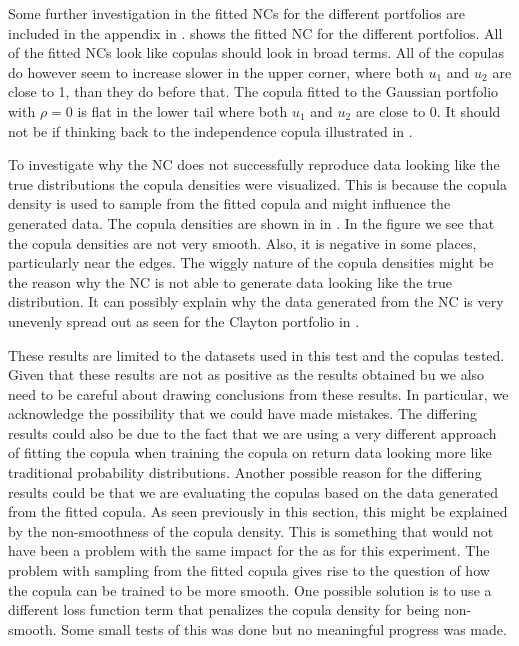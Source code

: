 Some further investigation in the fitted \gls{NC}s for the different portfolios are included in the appendix in .  shows the fitted \gls{NC} for the different portfolios. All of the fitted \gls{NC}s look like copulas should look in broad terms. All of the copulas do however seem to increase slower in the upper corner, where both $u_1$ and $u_2$ are close to 1, than they do before that. The copula fitted to the Gaussian portfolio with $\rho = 0$ is flat in the lower tail where both $u_1$ and $u_2$ are close to 0. It should not be if thinking back to the independence copula illustrated in .      

To investigate why the \gls{NC} does not successfully reproduce data looking like the true distributions the copula densities were visualized. This is because the copula density is used to sample from the fitted copula and might influence the generated data. The copula densities are shown in  in . In the figure we see that the copula densities are not very smooth. Also, it is negative in some places, particularly near the edges. The wiggly nature of the copula densities might be the reason why the \gls{NC} is not able to generate data looking like the true distribution. It can possibly explain why the data generated from the \gls{NC} is very unevenly spread out as seen for the Clayton portfolio in . 

These results are limited to the datasets used in this test and the copulas tested. Given that these results are not as positive as the results obtained bu  we also need to be careful about drawing conclusions from these results. In particular, we acknowledge the possibility that we could have made mistakes. The differing results could also be due to the fact that we are using a very different approach of fitting the copula when training the copula on return data looking more like traditional probability distributions. Another possible reason for the differing results could be that we are evaluating the copulas based on the data generated from the fitted copula. As seen previously in this section, this might be explained by the non-smoothness of the copula density. This is something that would not have been a problem with the same impact for the  as for this experiment. The problem with sampling from the fitted copula gives rise to the question of how the copula can be trained to be more smooth. One possible solution is to use a different loss function term that penalizes the copula density for being non-smooth. Some small tests of this was done but no meaningful progress was made. 






